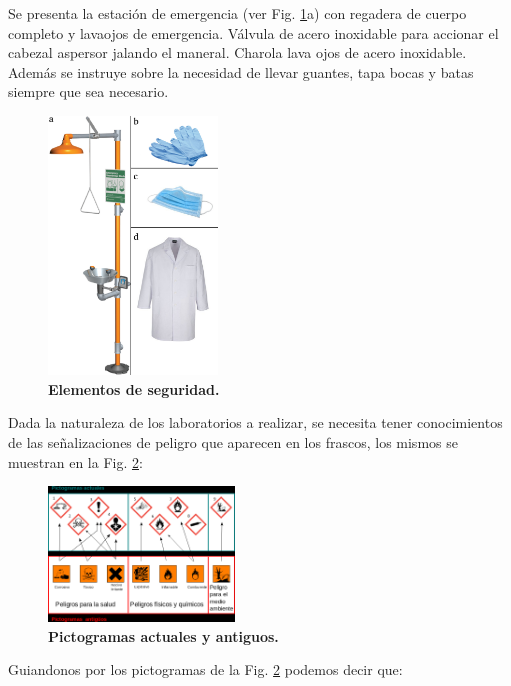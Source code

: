 Se presenta la estación de emergencia (ver Fig. \ref{fig1.1}a) con regadera de cuerpo completo y lavaojos de emergencia. Válvula de acero inoxidable para accionar el cabezal aspersor jalando el maneral. Charola lava ojos de acero inoxidable. Además se instruye sobre la necesidad de llevar guantes, tapa bocas y batas siempre que sea necesario.
     \begin{figure}
    \includegraphics[width=0.4\textwidth]{Tarea1/emergencia.png}
    \caption{\textbf{Elementos de seguridad.}}
    \label{fig1.1}
    \end{figure}
Dada la naturaleza de los laboratorios a realizar, se necesita tener conocimientos de las señalizaciones de peligro que aparecen en los frascos, los mismos se muestran en la Fig. \ref{fig1.2}: 
\begin{figure}
    \includegraphics[width=0.44\textwidth]{Tarea1/toxico.png}
    \caption{\textbf{Pictogramas actuales y antiguos.}}
    \label{fig1.2}
\end{figure}
Guiandonos por los pictogramas de la Fig. \ref{fig1.2} podemos decir que:
